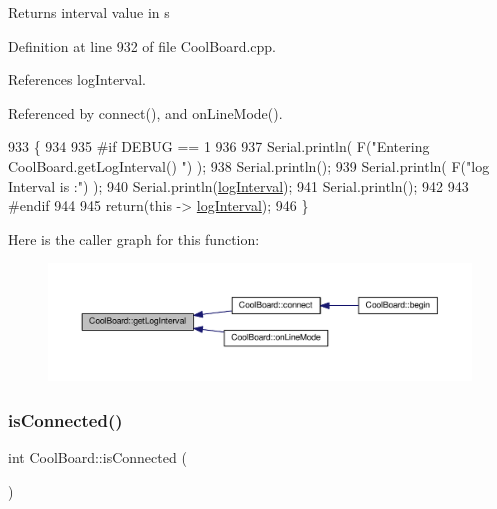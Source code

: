 \begin{DoxyReturn}{Returns}
interval value in s 
\end{DoxyReturn}


Definition at line 932 of file Cool\+Board.\+cpp.



References log\+Interval.



Referenced by connect(), and on\+Line\+Mode().


\begin{DoxyCode}
933 \{
934 
935 \textcolor{preprocessor}{#if DEBUG == 1}
936 
937     Serial.println( F(\textcolor{stringliteral}{"Entering CoolBoard.getLogInterval() "}) );
938     Serial.println();
939     Serial.println( F(\textcolor{stringliteral}{"log Interval is :"}) );
940     Serial.println(\hyperlink{classCoolBoard_a84bc94413b64973e4aba8c467c97006c}{logInterval});
941     Serial.println();
942 
943 \textcolor{preprocessor}{#endif}
944 
945     \textcolor{keywordflow}{return}(\textcolor{keyword}{this} -> \hyperlink{classCoolBoard_a84bc94413b64973e4aba8c467c97006c}{logInterval});
946 \}
\end{DoxyCode}
Here is the caller graph for this function\+:
\nopagebreak
\begin{figure}[H]
\begin{center}
\leavevmode
\includegraphics[width=350pt]{classCoolBoard_a7508e029f2ee17bb747ffab599285e0d_icgraph}
\end{center}
\end{figure}
\mbox{\label{classCoolBoard_ad7442cf4b62c7b0d5bd62a0f75ffc065}} 
\subsubsection{\texorpdfstring{is\+Connected()}{isConnected()}}
{\footnotesize\ttfamily int Cool\+Board\+::is\+Connected (\begin{DoxyParamCaption}{ }\end{DoxyParamCaption})}

